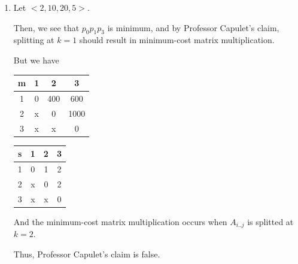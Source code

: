 \documentclass[12pt]{article}
\begin{document}
\begin{enumerate}[1.]
    \item

        Let $<2,10,20,5>$.

        \bigskip

        Then, we see that $p_0p_1p_3$ is minimum, and by  Professor Capulet's claim,
        splitting at $k = 1$ should result in minimum-cost matrix multiplication.

        \bigskip

        But we have

        \begin{center}
            \begin{tabular}{|c|c|c|c|}
                \hline
                m & 1 & 2 & 3\\
                \hline
                1 & 0 & 400 & 600\\
                \hline
                2 & x & 0 & 1000\\
                \hline
                3 & x & x & 0\\
                \hline
            \end{tabular}

            \begin{tabular}{|c|c|c|c|}
                \hline
                s & 1 & 2 & 3\\
                \hline
                1 & 0 & 1 & \color{red}2\color{black}\\
                \hline
                2 & x & 0 & 2\\
                \hline
                3 & x & x & 0\\
                \hline
            \end{tabular}
        \end{center}

        \bigskip

        And the minimum-cost matrix multiplication occurs when $A_{i..j}$ is splitted
        at $k = 2$.

        \bigskip

        Thus, Professor Capulet's claim is false.






\end{enumerate}
\end{document}
